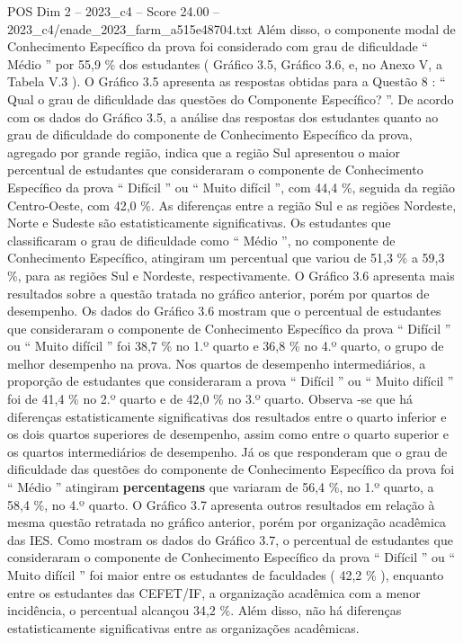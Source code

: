 \begin{textsample}{POS Dim 2 – 2023\_c4 – Score 24.00 – 2023\_c4/enade\_2023\_farm\_a515e48704.txt}
Além disso, o componente modal de Conhecimento Específico da prova foi considerado com grau de dificuldade “ Médio ” por 55,9 \% dos estudantes ( Gráfico 3.5, Gráfico 3.6, e, no Anexo V, a Tabela V.3 ).
O Gráfico 3.5 apresenta as respostas obtidas para a Questão 8 : “ Qual o grau de dificuldade das questões do Componente Específico? ”.
De acordo com os dados do Gráfico 3.5, a análise das respostas dos estudantes quanto ao grau de dificuldade do componente de Conhecimento Específico da prova, agregado por grande região, indica que a região Sul apresentou o maior percentual de estudantes que consideraram o componente de Conhecimento Específico da prova “ Difícil ” ou “ Muito difícil ”, com 44,4 \%, seguida da região Centro-Oeste, com 42,0 \%.
As diferenças entre a região Sul e as regiões Nordeste, Norte e Sudeste são estatisticamente significativas.
Os estudantes que classificaram o grau de dificuldade como “ Médio ”, no componente de Conhecimento Específico, atingiram um percentual que variou de 51,3 \% a 59,3 \%, para as regiões Sul e Nordeste, respectivamente.
O Gráfico 3.6 apresenta mais resultados sobre a questão tratada no gráfico anterior, porém por quartos de desempenho.
Os dados do Gráfico 3.6 mostram que o percentual de estudantes que consideraram o componente de Conhecimento Específico da prova “ Difícil ” ou “ Muito difícil ” foi 38,7 \% no 1.º quarto e 36,8 \% no 4.º quarto, o grupo de melhor desempenho na prova.
Nos quartos de desempenho intermediários, a proporção de estudantes que consideraram a prova “ Difícil ” ou “ Muito difícil ” foi de 41,4 \% no 2.º quarto e de 42,0 \% no 3.º quarto.
Observa -se que há diferenças estatisticamente significativas dos resultados entre o quarto inferior e os dois quartos superiores de desempenho, assim como entre o quarto superior e os quartos intermediários de desempenho.
Já os que responderam que o grau de dificuldade das questões do componente de Conhecimento Específico da prova foi “ Médio ” atingiram \textbf{percentagens} que variaram de 56,4 \%, no 1.º quarto, a 58,4 \%, no 4.º quarto.
O Gráfico 3.7 apresenta outros resultados em relação à mesma questão retratada no gráfico anterior, porém por organização acadêmica das IES.
Como mostram os dados do Gráfico 3.7, o percentual de estudantes que consideraram o componente de Conhecimento Específico da prova “ Difícil ” ou “ Muito difícil ” foi maior entre os estudantes de faculdades ( 42,2 \% ), enquanto entre os estudantes das CEFET/IF, a organização acadêmica com a menor incidência, o percentual alcançou 34,2 \%.
Além disso, não há diferenças estatisticamente significativas entre as organizações acadêmicas.

\end{textsample}
